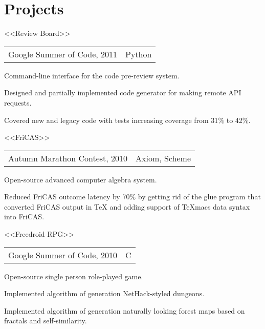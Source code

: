 \documentclass[a4paper]{article}
\begin{document}

	\section{Projects}
	\begin{multicols}{2}
		\raggedcolumns
		\begin{project2}{<<Review Board>>}{\begin{tabular}{@{}l|l}Google Summer of Code, 2011 & Python\\\end{tabular}}
			Command-line interface for the code pre-review system.
			\begin{items}
				\item Designed and partially implemented code generator for making remote API requests.
				\item Covered new and legacy code with tests increasing coverage from 31$\%$ to 42$\%$.
			\end{items}
		\end{project2}

		\begin{project2}{<<FriCAS>>}{\begin{tabular}{@{}l|l}Autumn Marathon Contest, 2010 & Axiom, Scheme\\\end{tabular}}
			Open-source advanced computer algebra system.
			\begin{items}
				\item Reduced FriCAS outcome latency by 70$\%$ by getting rid of the glue program that converted FriCAS output in \TeX{} and adding support of TeXmacs data syntax into FriCAS.
			\end{items}
		\end{project2}

		\columnbreak

		\begin{project2}{<<Freedroid RPG>>}{\begin{tabular}{@{}l|l}Google Summer of Code, 2010 & C\\\end{tabular}}
			Open-source single person role-played game.
			\begin{items}
				\item Implemented algorithm of generation NetHack-styled dungeons.
				\item Implemented algorithm of generation naturally looking forest maps based on fractals and self-similarity.
			\end{items}
		\end{project2}


\end{multicols}
\end{document}
